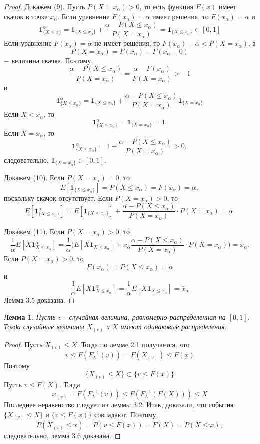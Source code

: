 \documentclass[14pt,a4paper]{article}
\theoremstyle{plain}
\newtheorem{Lemma}{Лемма}[section]
\theoremstyle{definition}
\begin{document}
\begin{proof}
 Докажем (9).
Пусть $P(X=x_\alpha)>0$, то есть функция $F(x)$ имеет скачок в точке $x_\alpha$.
Если уравнение $F(x_\alpha)=\alpha$ имеет решения, то $F(x_\alpha)=\alpha$ и
$$
\mathbf{1}^\alpha_{\{X \le x\}} = \mathbf{1}_{\{X \le x_\alpha\}}+\frac{\alpha-P(X \le x_\alpha)}{P(X=x_\alpha)}=\mathbf{1}_{\{X \le x_\alpha\}} \in [0,1]
$$
Если уравнение $F(x_\alpha)=\alpha$ не имеет решения, то $F(x_\alpha)-\alpha < P(X=x_\alpha)$, а $$P(X=x_\alpha)=F(x_\alpha)-F(x_\alpha-0)$$ $-$ величина скачка. Поэтому,
$$
\frac{\alpha-P(X \le x_\alpha)}{P(X=x_\alpha)} = \frac{\alpha-F(x_\alpha)}{F(X=x_\alpha)} > -1
$$
и
$$
\mathbf{1}^\alpha_{\{X \le x_\alpha\}}=\mathbf{1}_{\{X \le x_\alpha\}}+\frac{\alpha-P(X \le x_\alpha)}{P(X=x_\alpha)}\mathbf{1}_{\{X = x_\alpha\}}
$$
Если $X<x_\alpha$, то $$\mathbf{1}^\alpha_{\{X \le x_\alpha\}}=\mathbf{1}_{\{X = x_\alpha\}} = 1.$$
Если $X=x_\alpha$, то $$\mathbf{1}^\alpha_{\{X \le x_\alpha\}} = 1 + \frac{\alpha-P(X\le x_\alpha)}{P(X=x_\alpha)} >0,$$ следовательно, $\mathbf{1}_{\{X = x_\alpha\}} \in [0,1]$.

 Докажем (10).
Если $P(X=x_\alpha)=0$, то $$E[\mathbf{1}_{\{X\le x_{\alpha}\}} ] =P(X \le x_\alpha) = F(x_\alpha)=\alpha,$$ поскольку скачок отсутствует.
Если $P(X=x_\alpha)>0$, то $$E[\mathbf{1}^\alpha_{\{X\le x_{\alpha}\}} ] = E[\mathbf{1}_{\{X\le x_{\alpha}\}} ] + \frac{\alpha-P(X \le x_\alpha)}{P(X=x_\alpha)} \cdot P(X=x_\alpha) = \alpha.$$

 Докажем (11).
Если $P(X=x_\alpha)>0$, то
$$
\frac{1}{\alpha}E[X\mathbf{1}^\alpha_{X\le x_{\alpha}} ] = \frac{1}{\alpha} \Big( E[X\mathbf{1}_{X\le x_{\alpha}} ] +
x_\alpha \frac{\alpha-P(X \le x_\alpha)}{P(X=x_\alpha)}\cdot P(X=x_\alpha)\Big) =\bar{x}_{\alpha}.
$$
Если $P(X=x_\alpha)>0$, то
$$F(x_\alpha) = P(X \le x_\alpha) = \alpha$$ и $$\frac{1}{\alpha}E[X\mathbf{1}^\alpha_{X\le x_{\alpha}} ] = \frac{1}{\alpha}E[X\mathbf{1}_{X\le x_{\alpha}} ] = \bar{x}_{\alpha} $$
Лемма 3.5 доказана.
\end{proof}

\begin{Lemma}
Пусть $v$ - случайная величина, равномерно распределенная на $[0,1]$. Тогда случайные величины $X_{(v)}$ и $X$ имеют одинаковые распределения.
\end{Lemma}
\begin{proof}
Пусть $X_{(v)} \le X$. Тогда по леммe 2.1 получается, что
$$
v \le F(F^{-1}_L (v)) = F(X_{(v)}) \le F(x)
$$
Поэтому $$\{X_{(v)} \le X \} \subset \{v \le F(x) \}
$$
Пусть $v\le F(X)$. Тогда
$$
x_{(v)}= F(F^{-1}_L (v)) \le  F(F^{-1}_L (F(X)))\le X
$$
Последнее неравенство следует из леммы 3.2.
Итак, доказали, что события $\{X_{(v)} \le X \} $ и $ \{v \le F(x) \} $ совпадают. Поэтому,
$$P(X_{(v)} \le x) = P(v \le F(x)) = F(X) = P(X \le x), $$ следовательно, лемма 3.6 доказана.
\end{proof}
\end{document}
